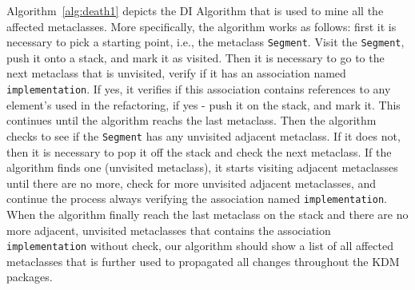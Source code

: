 Algorithm~\ref{alg:death1} depicts the DI Algorithm that is used to mine all the affected metaclasses. %
%
More specifically, the algorithm works as follows: first it is necessary to pick a starting point, i.e., the metaclass \texttt{Segment}. Visit the \texttt{Segment}, push it onto a stack, and mark it as visited. Then it is necessary to go to the next metaclass that is unvisited, verify if it has an association named \texttt{implementation}. If yes, it verifies if this association contains references to any element's used in the refactoring, if yes - push it on the stack, and mark it. This continues until the algorithm reachs the last metaclass. Then the algorithm checks to see if the \texttt{Segment} has any unvisited adjacent metaclass. If it does not, then it is necessary to pop it off the stack and check the next metaclass. If the algorithm finds one (unvisited metaclass), it starts visiting adjacent metaclasses until there are no more, check for more unvisited adjacent metaclasses, and continue the process always verifying the association named \texttt{implementation}. When the algorithm finally reach the last metaclass on the stack and there are no more adjacent, unvisited metaclasses that contains the association \texttt{implementation} without check, our algorithm should show a list of all affected metaclasses that is further used to propagated all changes throughout the KDM packages. 
%
%
%
%
%
%
%
%
%












